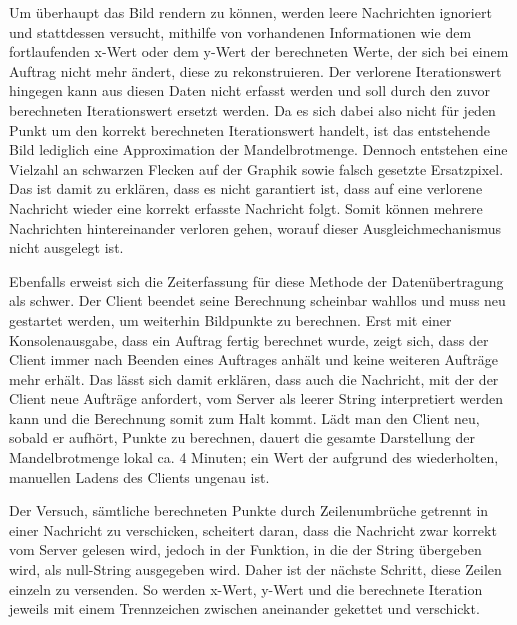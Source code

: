 \documentclass[12pt, onecolumn,notitlepage]{scrartcl}
\begin{document}
Um überhaupt das Bild rendern zu können, werden leere Nachrichten ignoriert und stattdessen versucht, mithilfe von vorhandenen Informationen wie dem fortlaufenden x-Wert oder dem y-Wert der berechneten Werte, der sich bei einem Auftrag nicht mehr ändert, diese zu rekonstruieren. Der verlorene Iterationswert hingegen kann aus diesen Daten nicht erfasst werden und soll durch den zuvor berechneten Iterationswert ersetzt werden. Da es sich dabei also nicht für jeden Punkt um den korrekt berechneten Iterationswert handelt, ist das entstehende Bild lediglich eine Approximation der Mandelbrotmenge. Dennoch entstehen eine Vielzahl an schwarzen Flecken auf der Graphik sowie falsch gesetzte Ersatzpixel. Das ist damit zu erklären, dass es nicht garantiert ist, dass auf eine verlorene Nachricht wieder eine korrekt erfasste Nachricht folgt. Somit können mehrere Nachrichten hintereinander verloren gehen, worauf dieser Ausgleichmechanismus nicht ausgelegt ist. \par

Ebenfalls erweist sich die Zeiterfassung für diese Methode der Datenübertragung als schwer. Der Client beendet seine Berechnung scheinbar wahllos und muss neu gestartet werden, um weiterhin Bildpunkte zu berechnen. Erst mit einer Konsolenausgabe, dass ein Auftrag fertig berechnet wurde, zeigt sich, dass der Client immer nach Beenden eines Auftrages anhält und keine weiteren Aufträge mehr erhält. Das lässt sich damit erklären, dass auch die Nachricht, mit der der Client neue Aufträge anfordert, vom Server als leerer String interpretiert werden kann und die Berechnung somit zum Halt kommt. Lädt man den Client neu, sobald er aufhört, Punkte zu berechnen, dauert die gesamte Darstellung der Mandelbrotmenge lokal ca. 4 Minuten; ein Wert der aufgrund des wiederholten, manuellen Ladens des Clients ungenau ist.\par

Der Versuch, sämtliche berechneten Punkte durch Zeilenumbrüche getrennt in einer Nachricht zu verschicken, scheitert daran, dass die Nachricht zwar korrekt vom Server gelesen wird, jedoch in der Funktion, in die der String übergeben wird, als null-String ausgegeben wird. Daher ist der nächste Schritt, diese Zeilen einzeln zu versenden. So werden x-Wert, y-Wert und die berechnete Iteration jeweils mit einem Trennzeichen zwischen aneinander gekettet und verschickt. 
\end{document}
